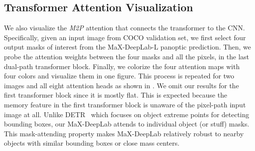 \subsection{Transformer Attention Visualization}
We also visualize the {\it M2P} attention that connects the transformer to the CNN. Specifically, given an input image from COCO validation set, we first select four output masks of interest from the MaX-DeepLab-L panoptic prediction. Then, we probe the attention weights between the four masks and all the pixels, in the last dual-path transformer block. Finally, we colorize the four attention maps with four colors and visualize them in one figure. This process is repeated for two images and all eight attention heads as shown in . We omit our results for the first transformer block since it is mostly flat. This is expected because the memory feature in the first transformer block is unaware of the pixel-path input image at all. Unlike DETR~\cite{carion2020end} which focuses on object extreme points for detecting bounding boxes, our MaX-DeepLab attends to individual object (or stuff) masks. This mask-attending property makes MaX-DeepLab relatively robust to nearby objects with similar bounding boxes or close mass centers.


